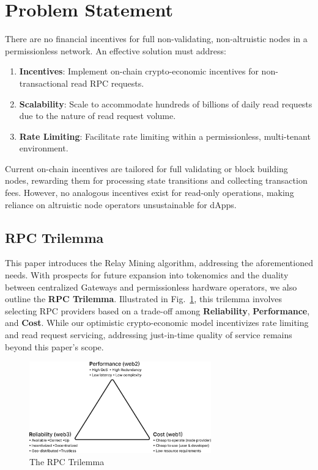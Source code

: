 \documentclass[runningheads]{llncs}
\begin{document}
\section{Problem Statement}\label{problem-statement}

There are no financial incentives for full non-validating, non-altruistic nodes in a permissionless network. An effective solution must address:

\begin{enumerate}
    \item \textbf{Incentives}: Implement on-chain crypto-economic incentives for non-transactional read RPC requests.
    \item \textbf{Scalability}: Scale to accommodate hundreds of billions of daily read requests due to the nature of read request volume.
    \item \textbf{Rate Limiting}: Facilitate rate limiting within a permissionless, multi-tenant environment.
\end{enumerate}

Current on-chain incentives are tailored for full validating or block building nodes, rewarding them for processing state transitions and collecting transaction fees. However, no analogous incentives exist for read-only operations, making reliance on altruistic node operators unsustainable for dApps.

\subsection{RPC Trilemma}

This paper introduces the Relay Mining algorithm, addressing the aforementioned needs. With prospects for future expansion into tokenomics and the duality between centralized Gateways and permissionless hardware operators, we also outline the \textbf{RPC Trilemma}. Illustrated in Fig.~\ref{fig:rpc-trilemma}, this trilemma involves selecting RPC providers based on a trade-off among \textbf{Reliability}, \textbf{Performance}, and \textbf{Cost}. While our optimistic crypto-economic model incentivizes rate limiting and read request servicing, addressing just-in-time quality of service remains beyond this paper's scope.

\begin{figure}
    \centering
    \includegraphics[width=0.7\textwidth]{rpc_trilemma.png}
    \caption{The RPC Trilemma} \label{fig:rpc-trilemma}
\end{figure}
\end{document}
